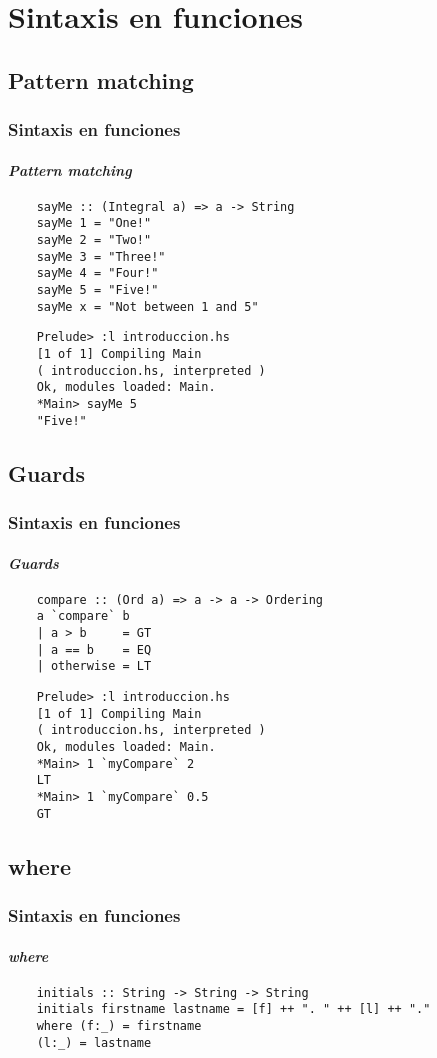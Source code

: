 \documentclass{beamer}
\begin{document}
\section{Sintaxis en funciones}
\subsection{Pattern matching}
\begin{frame}[fragile]
  \frametitle{Sintaxis en funciones}
  \framesubtitle{\emph{Pattern matching}}
  \begin{verbatim}
    sayMe :: (Integral a) => a -> String
    sayMe 1 = "One!"
    sayMe 2 = "Two!"
    sayMe 3 = "Three!"
    sayMe 4 = "Four!"
    sayMe 5 = "Five!"
    sayMe x = "Not between 1 and 5"
  \end{verbatim}

  \begin{verbatim}
    Prelude> :l introduccion.hs
    [1 of 1] Compiling Main
    ( introduccion.hs, interpreted )
    Ok, modules loaded: Main.
    *Main> sayMe 5
    "Five!"
  \end{verbatim}
\end{frame}

\subsection{Guards}
\begin{frame}[fragile]
  \frametitle{Sintaxis en funciones}
  \framesubtitle{\emph{Guards}}
  \begin{verbatim}
    compare :: (Ord a) => a -> a -> Ordering
    a `compare` b
    | a > b     = GT
    | a == b    = EQ
    | otherwise = LT
  \end{verbatim}
  \begin{verbatim}
    Prelude> :l introduccion.hs
    [1 of 1] Compiling Main
    ( introduccion.hs, interpreted )
    Ok, modules loaded: Main.
    *Main> 1 `myCompare` 2
    LT
    *Main> 1 `myCompare` 0.5
    GT
  \end{verbatim}
\end{frame}

\subsection{where}
\begin{frame}[fragile]
  \frametitle{Sintaxis en funciones}
  \framesubtitle{\emph{where}}
  \begin{verbatim}
    initials :: String -> String -> String
    initials firstname lastname = [f] ++ ". " ++ [l] ++ "."
    where (f:_) = firstname
    (l:_) = lastname
  \end{verbatim}
\end{frame}
\end{document}
